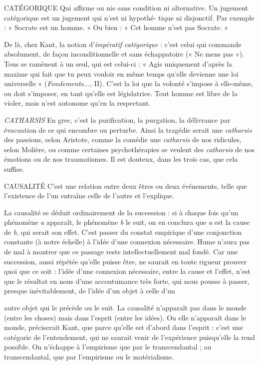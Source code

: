 CATÉGORIQUE Qui affirme ou nie sans condition ni alternative. Un jugement
catégorique est un jugement qui n’est ni hypothé-
tique ni disjonctif. Par exemple : « Socrate est un homme. » Ou bien : « Cet
homme n’est pas Socrate. »

De là, chez Kant, la notion d’{\it impératif catégorique} : c'est celui qui commande
absolument, de façon inconditionnelle et sans échappatoire (« Ne mens
pas »). Tous se ramènent à un seul, qui est celui-ci : « Agis uniquement d’après
la maxime qui fait que tu peux vouloir en même temps qu’elle devienne une loi
universelle » ({\it Fondements...}, II). C’est la loi que la volonté s’impose à elle-même,
ou doit s'imposer, en tant qu’elle est législatrice. Tout homme est libre
de la violer, mais n’est autonome qu’en la respectant.

{\it CATHARSIS} En grec, c’est la purification, la purgation, la délivrance par
évacuation de ce qui encombre ou perturbe. Ainsi la tragédie
serait une {\it catharsis} des passions, selon Aristote, comme la comédie une {\it catharsis}
de nos ridicules, selon Molière, ou comme certaines psychothérapies se veulent
des {\it catharsis} de nos émotions ou de nos traumatismes. Il est douteux, dans les
trois cas, que cela suffise.

CAUSALITÉ C’est une relation entre deux êtres ou deux événements, telle
que l'existence de l’un entraîne celle de l’autre et l'explique.

La causalité se déduit ordinairement de la succession : si à chaque fois
qu’un phénomène {\it a} apparaît, le phénomène {\it b} le suit, on en conclura que {\it a} est
la cause de {\it b}, qui serait son effet. C’est passer du constat empirique d’une
conjonction constante (à notre échelle) à l’idée d’une connexion nécessaire.
Hume n’aura pas de mal à montrer que ce passage reste intellectuellement mal
fondé. Car une succession, aussi répétée qu’elle puisse être, ne saurait en toute
rigueur prouver quoi que ce soit : l’idée d’une connexion nécessaire, entre la
cause et l’effet, n’est que le résultat en nous d’une accoutumance très forte, qui
nous pousse à passer, presque inévitablement, de l’idée d’un objet à celle d’un

autre objet qui le précède ou le suit. La causalité n’apparaît pas dans le monde
(entre les choses) mais dans l'esprit (entre les idées). Ou elle n’apparaît dans le
monde, préciserait Kant, que parce qu’elle est d’abord dans l'esprit : c’est une
catégorie de l’entendement, qui ne saurait venir de l'expérience puisqu'elle la
rend possible. On n’échappe à l’empirisme que par le transcendantal ; au transcendantal,
que par l’empirisme ou le matérialisme.

